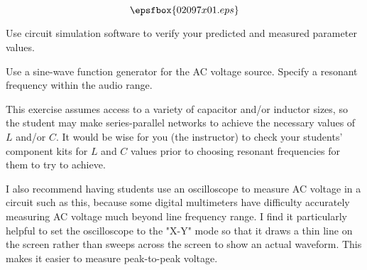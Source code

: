 

$$\epsfbox{02097x01.eps}$$

\vfil \eject






Use circuit simulation software to verify your predicted and measured parameter values.







Use a sine-wave function generator for the AC voltage source.  Specify a resonant frequency within the audio range.

This exercise assumes access to a variety of capacitor and/or inductor sizes, so the student may make series-parallel networks to achieve the necessary values of $L$ and/or $C$.  It would be wise for you (the instructor) to check your students' component kits for $L$ and $C$ values prior to choosing resonant frequencies for them to try to achieve.

I also recommend having students use an oscilloscope to measure AC voltage in a circuit such as this, because some digital multimeters have difficulty accurately measuring AC voltage much beyond line frequency range.  I find it particularly helpful to set the oscilloscope to the "X-Y" mode so that it draws a thin line on the screen rather than sweeps across the screen to show an actual waveform.  This makes it easier to measure peak-to-peak voltage.




